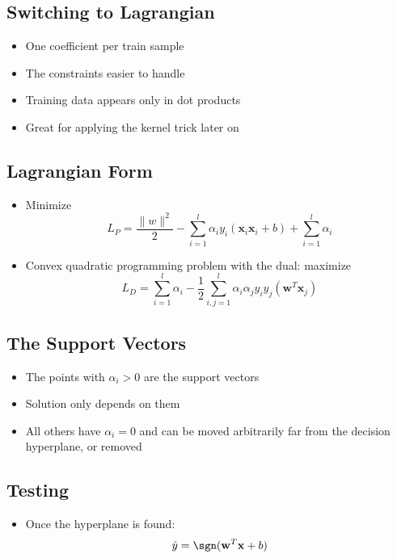 \documentclass[12pt]{article}
\begin{document}
\subsection{Switching to Lagrangian}
  \begin{itemize}
  \item One coefficient per train sample
  \item The constraints easier to handle
  \item Training data appears only in dot products
  \item Great for applying the kernel trick later on
  \end{itemize}


\subsection{Lagrangian Form}
  \begin{itemize}
  \item Minimize
    \begin{equation}
      L_P = \frac{\|w\|^2}{2} - \displaystyle\sum_{i=1}^l \alpha_i y_i (\mathbf x_i \mathbf x_i + b) + \displaystyle\sum^l_{i=1} \alpha_i
    \end{equation}
  \item Convex quadratic programming problem with the dual: maximize
    \begin{equation}
      L_D = \displaystyle\sum^l_{i=1} \alpha_i - \frac{1}{2}\displaystyle\sum_{i,j=1}^l \alpha_i \alpha_j y_i y_j (\mathbf w^T \mathbf x_j)
    \end{equation}
  \end{itemize}


\subsection{The Support Vectors}
  \begin{itemize}
  \item The points with $\alpha_i > 0$ are the support vectors
  \item Solution only depends on them
  \item All  others have $\alpha_i =  0$ and can  be moved arbitrarily
    far from the decision hyperplane, or removed
  \end{itemize}


\subsection{Testing}
  \begin{itemize}
  \item Once the hyperplane is found:
    \begin{equation}
      \hat y = \sgn(\mathbf w^T \mathbf x + b)
    \end{equation}
  \end{itemize}
\end{document}
